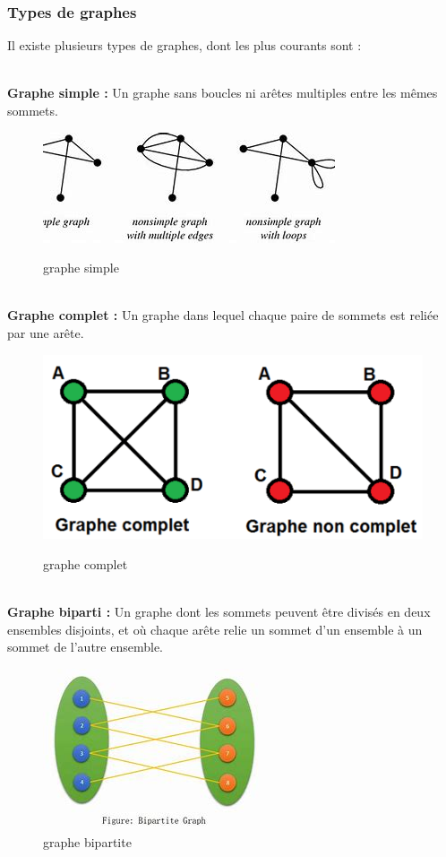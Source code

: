 \documentclass{article}
\begin{document}
\newpage
\subsubsection{Types de graphes}

Il existe plusieurs types de graphes, dont les plus courants sont :

\\
     \textbf{Graphe simple :} Un graphe sans boucles ni arêtes multiples entre les mêmes sommets.
\begin{figure}[h]
    \centering
    \includegraphics[width=0.4\linewidth]{Images/simple_graph.jpeg}
    \caption{graphe simple}
    \cite{graph_image3}
    \end{figure}
     
  \\   \textbf{Graphe complet :} Un graphe dans lequel chaque paire de sommets est reliée par une arête.

    \begin{figure}[h]
    \centering
    \includegraphics[width=0.4\linewidth]{Images/graph_simple_complet.png}
    \caption{graphe complet}
    
    \cite{graph_image4}
\end{figure}
    
  \\  \textbf{Graphe biparti :} Un graphe dont les sommets peuvent être divisés en deux ensembles disjoints, et où chaque arête relie un sommet d'un ensemble à un sommet de l'autre ensemble.

\begin{figure}[h]
    \centering
    \includegraphics[width=0.4\linewidth]{Images/bipartite_graph.jpeg}
    \caption{graphe bipartite}
\end{figure}
\end{document}
